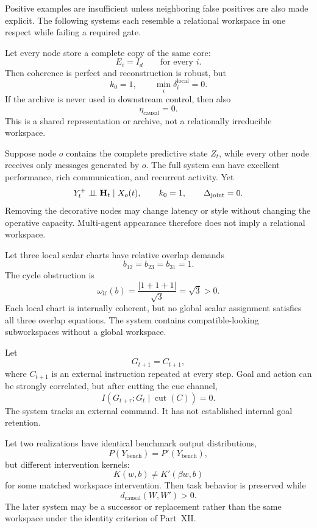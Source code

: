 
Positive examples are insufficient unless neighboring false positives are also
made explicit. The following systems each resemble a relational workspace in
one respect while failing a required gate.


Let every node store a complete copy of the same core:
\[
E_i=I_d
\qquad\text{for every }i.
\]
Then coherence is perfect and reconstruction is robust, but
\[
k_0=1,
\qquad
\min_i\delta_i^{\mathrm{local}}=0.
\]
If the archive is never used in downstream control, then also
\[
\eta_{\mathrm{causal}}=0.
\]
This is a shared representation or archive, not a relationally irreducible
workspace.


Suppose node \(o\) contains the complete predictive state \(Z_t\), while every
other node receives only messages generated by \(o\). The full system can have
excellent performance, rich communication, and recurrent activity. Yet
\[
Y_t^+\perp\!\!\!\perp\mathbf H_t\mid X_o(t),
\qquad
k_0=1,
\qquad
\Delta_{\mathrm{joint}}=0.
\]
Removing the decorative nodes may change latency or style without changing the
operative capacity. Multi-agent appearance therefore does not imply a
relational workspace.


Let three local scalar charts have relative overlap demands
\[
b_{12}=b_{23}=b_{31}=1.
\]
The cycle obstruction is
\[
\omega_{\mathcal U}(b)
=
\frac{|1+1+1|}{\sqrt3}
=\sqrt3>0.
\]
Each local chart is internally coherent, but no global scalar assignment
satisfies all three overlap equations. The system contains compatible-looking
subworkspaces without a global workspace.


Let
\[
G_{t+1}=C_{t+1},
\]
where \(C_{t+1}\) is an external instruction repeated at every step. Goal and
action can be strongly correlated, but after cutting the cue channel,
\[
I(G_{t+\tau};G_t\mid\operatorname{cut}(C))=0.
\]
The system tracks an external command. It has not established internal goal
retention.


Let two realizations have identical benchmark output distributions,
\[
P(Y_{\mathrm{bench}})=P'(Y_{\mathrm{bench}}),
\]
but different intervention kernels:
\[
K(w,b)\neq K'(\beta w,b)
\]
for some matched workspace intervention. Then task behavior is preserved while
\[
d_{\mathrm{causal}}(W,W')>0.
\]
The later system may be a successor or replacement rather than the same
workspace under the identity criterion of Part~XII.


